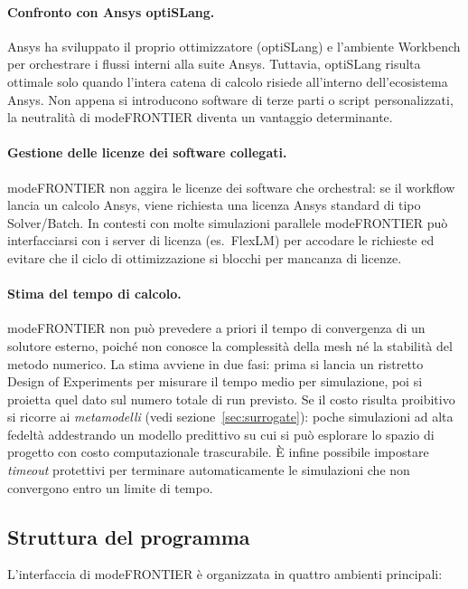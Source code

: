 \paragraph{Confronto con Ansys optiSLang.}
Ansys ha sviluppato il proprio ottimizzatore (optiSLang) e l'ambiente
Workbench per orchestrare i flussi interni alla suite Ansys.
Tuttavia, optiSLang risulta ottimale solo quando l'intera catena di
calcolo risiede all'interno dell'ecosistema Ansys.
Non appena si introducono software di terze parti o script personalizzati,
la neutralità di modeFRONTIER diventa un vantaggio determinante.

\paragraph{Gestione delle licenze dei software collegati.}
modeFRONTIER non aggira le licenze dei software che orchestral: se il
workflow lancia un calcolo Ansys, viene richiesta una licenza Ansys
standard di tipo Solver/Batch.
In contesti con molte simulazioni parallele modeFRONTIER può interfacciarsi
con i server di licenza (es.\ FlexLM) per accodare le richieste ed evitare
che il ciclo di ottimizzazione si blocchi per mancanza di licenze.

\paragraph{Stima del tempo di calcolo.}
modeFRONTIER non può prevedere a priori il tempo di convergenza di un
solutore esterno, poiché non conosce la complessità della mesh né la
stabilità del metodo numerico.
La stima avviene in due fasi: prima si lancia un ristretto Design of
Experiments per misurare il tempo medio per simulazione, poi si proietta
quel dato sul numero totale di run previsto.
Se il costo risulta proibitivo si ricorre ai \textit{metamodelli} (vedi
sezione~\ref{sec:surrogate}): poche simulazioni ad alta fedeltà
addestrando un modello predittivo su cui si può esplorare lo spazio di
progetto con costo computazionale trascurabile.
È infine possibile impostare \textit{timeout} protettivi per terminare
automaticamente le simulazioni che non convergono entro un limite di tempo.

\subsection{Struttura del programma}

L'interfaccia di modeFRONTIER è organizzata in quattro ambienti principali:

